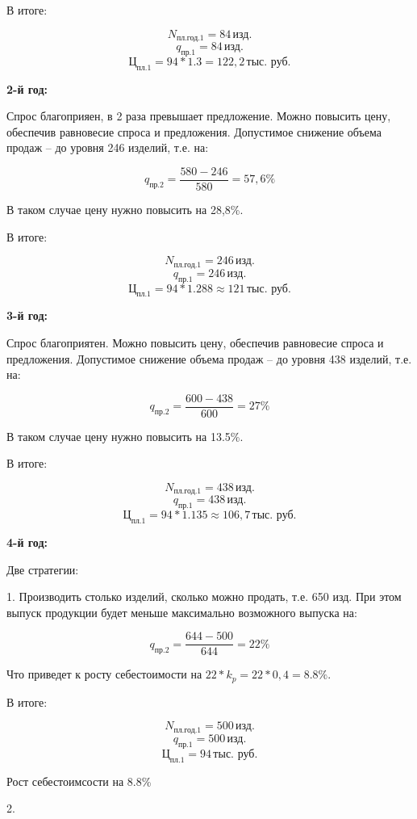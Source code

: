 В итоге:

\[
N_{\text{пл.год.1}} = 84 \, \text{изд.}
\]
\[
q_{\text{пр.1}} = 84 \, \text{изд.}
\]
\[
\text{Ц}_{\text{пл.1}} = 94 * 1.3 = 122,2 \, \text{тыс. руб.}
\]

\textbf{2-й год:}

Спрос благоприяен, в 2 раза превышает предложение. Можно повысить цену, обеспечив
равновесие спроса и предложения. Допустимое снижение объема продаж -- до уровня
246 изделий, т.е. на:

\[
q_{\text{пр.2}} = \frac{580 - 246}{580} = 57,6\%
\]

В таком случае цену нужно повысить на 28,8\%.

В итоге:

\[
N_{\text{пл.год.1}} = 246 \, \text{изд.}
\]
\[
q_{\text{пр.1}} = 246 \, \text{изд.}
\]
\[
\text{Ц}_{\text{пл.1}} = 94 * 1.288 \approx 121 \, \text{тыс. руб.}
\]

\textbf{3-й год:}

Спрос благоприятен. Можно повысить цену, обеспечив равновесие спроса и
предложения. Допустимое снижение объема продаж -- до уровня 438 изделий, т.е. на:

\[
q_{\text{пр.2}} = \frac{600 - 438}{600} = 27\%
\]

В таком случае цену нужно повысить на 13.5\%.

В итоге:

\[
N_{\text{пл.год.1}} = 438 \, \text{изд.}
\]
\[
q_{\text{пр.1}} = 438 \, \text{изд.}
\]
\[
\text{Ц}_{\text{пл.1}} = 94 * 1.135 \approx 106,7 \, \text{тыс. руб.}
\]

\textbf{4-й год:}

Две стратегии:

1. Производить столько изделий, сколько можно продать, т.е. 650 изд. При этом
выпуск продукции будет меньше максимально возможного выпуска на:

\[
q_{\text{пр.2}} = \frac{644 - 500}{644} = 22\%
\]

Что приведет к росту себестоимости на $22 * k_p = 22 * 0,4 = 8.8\%$.

В итоге:

\[
N_{\text{пл.год.1}} = 500 \, \text{изд.}
\]
\[
q_{\text{пр.1}} = 500 \, \text{изд.}
\]
\[
\text{Ц}_{\text{пл.1}} = 94 \, \text{тыс. руб.}
\]

Рост себестоимсости на 8.8\%

2.

